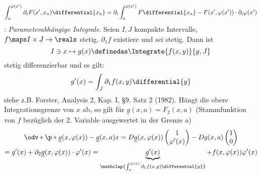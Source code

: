 \begin{bemerkung*}
\begin{equation*}
    \int_{a}^{\varphi(x')}\partial_i F(x',x_n)\differential{x_n}=\partial_i\int_{a}^{\varphi(x')}F\differential{x_n}-F(x',\varphi(x'))\cdot \partial_i\varphi(x')
\end{equation*}
: \emph{Parameterabhängige Integrale}.
Seien \( I,J \) kompakte Intervalle, \( f\maps I\times J\to \reals \) stetig.
\( \partial_1f \) existiere und sei stetig.
Dann ist 
\begin{equation*}
    I\ni x \mapsto g(x)\definedas \Integrate{ f(x,y)}{y,J}
\end{equation*}
stetig differenzierbar und es gilt:
\begin{equation*}
    g'(x)=\int_J\partial_1f(x,y)\differential{y}
\end{equation*}
siehe z.B. Forster, Analysis 2, Kap. I, §9. Satz 2 (1982).
Hängt die obere Integrationsgrenze von \( x \) ab, so gilt für \( \underline{g}(x,a)=F_2(x,a) \) (Stammfunktion von \( f \) bezüglich der 2. Variable ausgewertet in der Grenze \( a \))
\begin{gather*}
    \odv*{\p*{ \underline{g}(x,\varphi(x)) - \underline{g}(x,a) }}{x}= D\underline{g}(x,\varphi(x))\begin{pmatrix} 1\\\varphi'(x) \end{pmatrix} -Dg(x,a)\begin{pmatrix} 1\\0 \end{pmatrix} \\
    =g'(x)+\partial_2\underline{g}(x,\varphi(x))\cdot \varphi'(x)=\underbrace{g'(x)}_{\mathclap{\int_{a}^{\varphi(x)}\partial_1f(x,y)\differential{y}}}+f(x,\varphi(x))\varphi'(x)
\end{gather*}
\end{bemerkung*}

